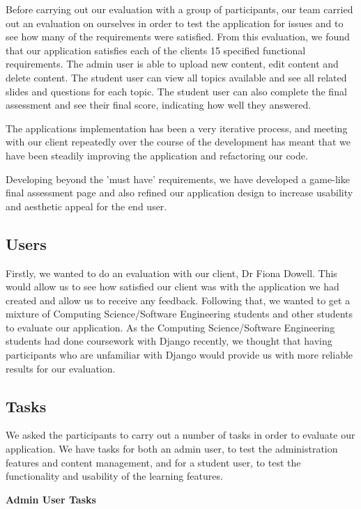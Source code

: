 \documentclass{l3proj}
\begin{document}
Before carrying out our evaluation with a group of participants, our team carried out an evaluation on ourselves in order to test the application for issues and to see how many of the requirements were satisfied. From this evaluation, we found that our application satisfies each of the clients 15 specified functional requirements. The admin user is able to upload new content, edit content and delete content. The student user can view all topics available and see all related slides and questions for each topic. The student user can also complete the final assessment and see their final score, indicating how well they answered.

The applications implementation has been a very iterative process, and meeting with our client repeatedly over the course of the development has meant that we have been steadily improving the application and refactoring our code.

Developing beyond the 'must have' requirements, we have developed a game-like final assessment page and also refined our application design to increase usability and aesthetic appeal for the end user.


\subsection{Users}

Firstly, we wanted to do an evaluation with our client, Dr Fiona Dowell. This would allow us to see how satisfied our client was with the application we had created and allow us to receive any feedback. Following that, we wanted to get a mixture of Computing Science/Software Engineering students and other students to evaluate our application. As the Computing Science/Software Engineering students had done coursework with Django recently, we thought that having participants who are unfamiliar with Django would provide us with more reliable results for our evaluation.

\subsection{Tasks}

We asked the participants to carry out a number of tasks in order to evaluate our application. We have tasks for both an admin user, to test the administration features and content management, and for a student user, to test the functionality and usability of the learning features.
\newpage

\textbf{Admin User Tasks}
\end{document}
